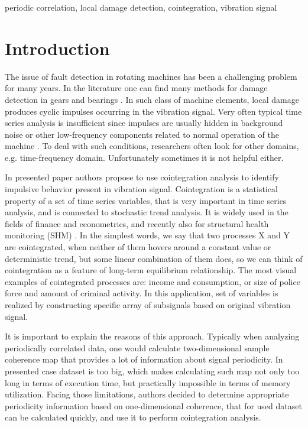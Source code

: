 \documentclass[preprint]{elsarticle}
\begin{document}
\begin{frontmatter}
\begin{keyword}
periodic correlation, local damage detection, cointegration, vibration signal
\end{keyword}

\end{frontmatter}


\section{Introduction}

The issue of fault detection in rotating machines has been a challenging problem for many years. In the literature one can find many methods for damage detection in gears and bearings \cite{feng2013recent,randall2011rolling,samuel2005review,obuchowski2014recent}. In such class of machine elements, local damage produces cyclic impulses occurring in the vibration signal. Very often typical time series analysis is insufficient since impulses are usually hidden in background noise or other low-frequency components related to normal operation of the machine \cite{wodecki2016combination,wodecki2017local,kruczek2017modified,zak2014novel,zak20161932,wylomanska2016impulsive,makowski2014new,wylomanska2016application}. To deal with such conditions, researchers often look for other domains, e.g. time-frequency domain. Unfortunately sometimes it is not helpful either.

In presented paper authors propose to use cointegration analysis to identify impulsive behavior present in vibration signal. Cointegration is a statistical property of a set of time series variables, that is very important in time series analysis, and is connected to stochastic trend analysis. It is widely used in the fields of finance and econometrics, and recently also for structural health monitoring (SHM) \cite{shi2016nonlinear,cross2011cointegration}. In the simplest words, we say that two processes X and Y are cointegrated, when neither of them hovers around a constant value or deterministic trend, but some linear combination of them does, so we can think of cointegration as a feature of long-term equilibrium relationship. The most visual examples of cointegrated processes are: income and consumption, or size of police force and amount of criminal activity. In this application, set of variables is realized by constructing specific array of subsignals based on original vibration signal. 

It is important to explain the reasons of this approach. Typically when analyzing periodically correlated data, one would calculate two-dimensional sample coherence map that provides a lot of information about signal periodicity. In presented case dataset is too big, which makes calculating such map not only too long in terms of execution time, but practically impossible in terms of memory utilization. Facing those limitations, authors decided to determine appropriate periodicity information based on one-dimensional coherence, that for used dataset can be calculated quickly, and use it to perform cointegration analysis.
\end{document}

